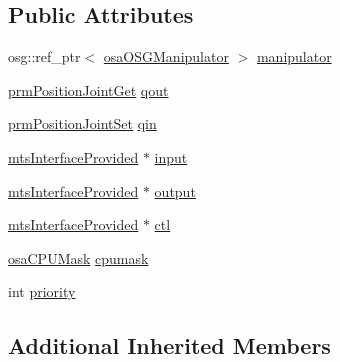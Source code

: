 \subsection*{Public Attributes}
\begin{DoxyCompactItemize}
\item 
osg\-::ref\-\_\-ptr$<$ \hyperlink{classosa_o_s_g_manipulator}{osa\-O\-S\-G\-Manipulator} $>$ \hyperlink{classmts_o_d_e_manipulator_task_af71c105f986e50bd23dd3a385bbf73d4}{manipulator}
\item 
\hyperlink{classprm_position_joint_get}{prm\-Position\-Joint\-Get} \hyperlink{classmts_o_d_e_manipulator_task_a162ca16e37ce8838ff2214b8b33f4b84}{qout}
\item 
\hyperlink{classprm_position_joint_set}{prm\-Position\-Joint\-Set} \hyperlink{classmts_o_d_e_manipulator_task_a07c031b24bcc9abafd6b00f1f8353a39}{qin}
\item 
\hyperlink{classmts_interface_provided}{mts\-Interface\-Provided} $\ast$ \hyperlink{classmts_o_d_e_manipulator_task_ad765a99ba781dadce40237760b2ea115}{input}
\item 
\hyperlink{classmts_interface_provided}{mts\-Interface\-Provided} $\ast$ \hyperlink{classmts_o_d_e_manipulator_task_a73b391727790f249e975cb84a385f753}{output}
\item 
\hyperlink{classmts_interface_provided}{mts\-Interface\-Provided} $\ast$ \hyperlink{classmts_o_d_e_manipulator_task_adc6a0ee6337d56ed19e8dddf86586498}{ctl}
\item 
\hyperlink{osa_c_p_u_affinity_8h_aaec7cdd7797e5e6eb5438c15fee5477a}{osa\-C\-P\-U\-Mask} \hyperlink{classmts_o_d_e_manipulator_task_aaff55dbeff38e947707c6b3405041622}{cpumask}
\item 
int \hyperlink{classmts_o_d_e_manipulator_task_ae2b16e466e4d216b2cf13ae89414696a}{priority}
\end{DoxyCompactItemize}
\subsection*{Additional Inherited Members}


